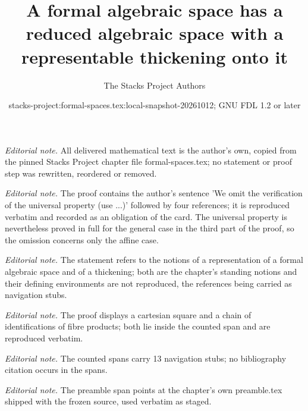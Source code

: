 \documentclass{stacks-project}
\title{A formal algebraic space has a reduced algebraic space with a representable thickening onto it}
\author{The Stacks Project Authors}
\date{stacks-project:formal-spaces.tex:local-snapshot-20261012; GNU FDL 1.2 or later}
\theoremstyle{plain}
\theoremstyle{definition}
\theoremstyle{remark}
\numberwithin{equation}{subsection}
\begin{document}
\maketitle
\noindent\textit{Editorial note.} All delivered mathematical text is the author's own, copied from the pinned Stacks Project chapter file formal-spaces.tex; no statement or proof step was rewritten, reordered or removed.\par\medskip
\noindent\textit{Editorial note.} The proof contains the author's sentence 'We omit the verification of the universal property (use ...)' followed by four references; it is reproduced verbatim and recorded as an obligation of the card. The universal property is nevertheless proved in full for the general case in the third part of the proof, so the omission concerns only the affine case.\par\medskip
\noindent\textit{Editorial note.} The statement refers to the notions of a representation of a formal algebraic space and of a thickening; both are the chapter's standing notions and their defining environments are not reproduced, the references being carried as navigation stubs.\par\medskip
\noindent\textit{Editorial note.} The proof displays a cartesian square and a chain of identifications of fibre products; both lie inside the counted span and are reproduced verbatim.\par\medskip
\noindent\textit{Editorial note.} The counted spans carry 13 navigation stubs; no bibliography citation occurs in the spans.\par\medskip
\noindent\textit{Editorial note.} The preamble span points at the chapter's own preamble.tex shipped with the frozen source, used verbatim as staged.\par\medskip
\end{document}
